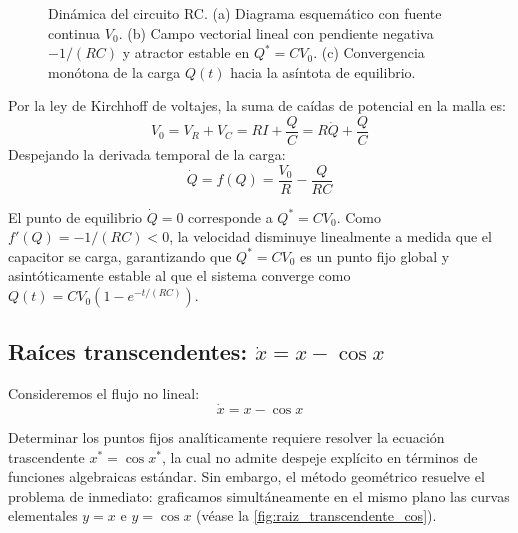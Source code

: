 \begin{figure}[htbp]
\caption{Dinámica del circuito RC. (a) Diagrama esquemático con fuente continua $V_0$. (b) Campo vectorial lineal con pendiente negativa $-1/(RC)$ y atractor estable en $Q^* = CV_0$. (c) Convergencia monótona de la carga $Q(t)$ hacia la asíntota de equilibrio.}
\label{fig:circuito_rc}
\end{figure}

Por la ley de Kirchhoff de voltajes, la suma de caídas de potencial en la malla es:
\begin{equation}
    V_0 = V_R + V_C = R I + \frac{Q}{C} = R \dot{Q} + \frac{Q}{C}
\end{equation}
Despejando la derivada temporal de la carga:
\begin{equation}
    \dot{Q} = f(Q) = \frac{V_0}{R} - \frac{Q}{RC}
    \label{eq:circuito_rc_ode}
\end{equation}

El punto de equilibrio $\dot{Q} = 0$ corresponde a $Q^* = C V_0$. Como $f'(Q) = -1/(RC) < 0$, la velocidad disminuye linealmente a medida que el capacitor se carga, garantizando que $Q^* = CV_0$ es un punto fijo global y asintóticamente estable al que el sistema converge como $Q(t) = C V_0 (1 - e^{-t/(RC)})$.

\subsection{Raíces transcendentes: $\dot{x} = x - \cos x$}

Consideremos el flujo no lineal:
\begin{equation}
    \dot{x} = x - \cos x
    \label{eq:flujo_x_cosx}
\end{equation}

Determinar los puntos fijos analíticamente requiere resolver la ecuación trascendente $x^* = \cos x^*$, la cual no admite despeje explícito en términos de funciones algebraicas estándar. Sin embargo, el método geométrico resuelve el problema de inmediato: graficamos simultáneamente en el mismo plano las curvas elementales $y = x$ e $y = \cos x$ (véase la \cref{fig:raiz_transcendente_cos}).


